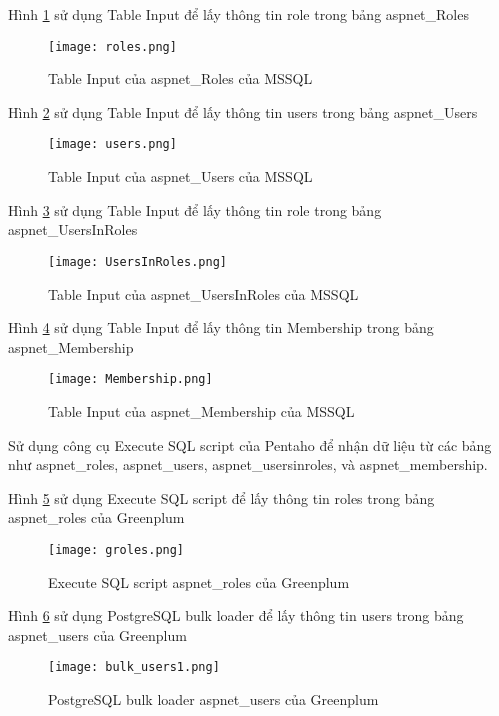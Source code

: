 Hình \ref{fig:roles} sử dụng Table Input để lấy thông tin role trong bảng aspnet\_Roles

\begin{figure}
    \centering
    \texttt{[image: roles.png]}
    \caption{Table Input của aspnet\_Roles của MSSQL}
    \label{fig:roles}
\end{figure}

Hình \ref{fig:usersl} sử dụng Table Input để lấy thông tin users trong bảng aspnet\_Users

\begin{figure}
    \centering
    \texttt{[image: users.png]}
    \caption{Table Input của aspnet\_Users của MSSQL}
    \label{fig:usersl}
\end{figure}

Hình \ref{fig:UsersInRoles} sử dụng Table Input để lấy thông tin role trong bảng aspnet\_UsersInRoles

\begin{figure}
    \centering
    \texttt{[image: UsersInRoles.png]}
    \caption{Table Input của aspnet\_UsersInRoles của MSSQL}
    \label{fig:UsersInRoles}
\end{figure}

Hình \ref{fig:Membership} sử dụng Table Input để lấy thông tin Membership trong bảng aspnet\_Membership

\begin{figure}
    \centering
    \texttt{[image: Membership.png]}
    \caption{Table Input của aspnet\_Membership của MSSQL}
    \label{fig:Membership}
\end{figure}


Sử dụng công cụ Execute SQL script của Pentaho để nhận dữ liệu từ các bảng như aspnet\_roles, aspnet\_users, aspnet\_usersinroles, và aspnet\_membership.

Hình \ref{fig:groles} sử dụng Execute SQL script để lấy thông tin roles trong bảng aspnet\_roles của Greenplum


\begin{figure}
    \centering
    \texttt{[image: groles.png]}
     \caption{Execute SQL script aspnet\_roles của Greenplum}
    \label{fig:groles}
\end{figure}

Hình \ref{fig:bulk_users1} sử dụng PostgreSQL bulk loader để lấy thông tin users trong bảng aspnet\_users của Greenplum


\begin{figure}
    \centering
    \texttt{[image: bulk\_users1.png]}
     \caption{PostgreSQL bulk loader aspnet\_users của Greenplum}
    \label{fig:bulk_users1}
\end{figure}

